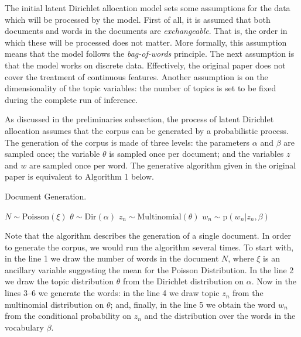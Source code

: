 \documentclass{mprop}
\begin{document}
\par The initial latent Dirichlet allocation model sets some assumptions for the data which will be processed by the model. First of all, it is assumed that both documents and words in the documents are \textit{exchangeable}. That is, the order in which these will be processed does not matter. More formally, this assumption means that the model follows the \textit{bag-of-words} principle. The next assumption is that the model works on discrete data. Effectively, the original paper does not cover the treatment of continuous features. Another assumption is on the dimensionality of the topic variables: the number of topics is set to be fixed during the complete run of inference.  

\par As discussed in the preliminaries subsection, the process of latent Dirichlet allocation assumes that the corpus can be generated by a probabilistic process. The generation of the corpus is made of three levels: the parameters $\alpha$ and $\beta$ are sampled once; the variable $\theta$ is sampled once per document; and the variables $z$ and $w$ are sampled once per word. The generative algorithm given in the original paper is equivalent to Algorithm 1 below.
\begin{algorithm}[H]
\caption{Document Generation.}
\label{alg:document_generation}
\begin{algorithmic}[1]
\State $N \sim \mbox{Poisson}(\xi)$
\State $\theta \sim \mbox{Dir}(\alpha)$
\State $z_n \sim \mbox{Multinomial}(\theta)$
\State $w_n \sim \mbox{p}(w_n | z_n, \beta)$
\EndFor
\end{algorithmic}
\end{algorithm}
Note that the algorithm describes the generation of a single document. In order to generate the corpus, we would run the algorithm several times. To start with, in the line 1 we draw the number of words in the document $N$, where $\xi$ is an ancillary variable suggesting the mean for the Poisson Distribution. In the line 2 we draw the topic distribution $\theta$ from the Dirichlet distribution on $\alpha$. Now in the lines 3--6 we generate the words: in the line 4 we draw topic $z_n$ from the multinomial distribution on $\theta$; and, finally, in the line 5 we obtain the word $w_n$ from the conditional probability on $z_n$ and the distribution over the words in the vocabulary $\beta$.
\end{document}
